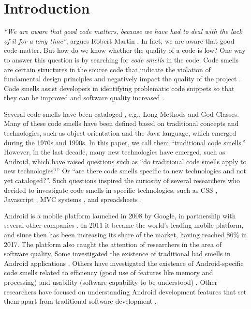 
\section{Introduction}

\emph{``We are aware that good code matters, because we have had to deal with the lack of it for a long time''}, argues Robert Martin \cite{CleanCode:08}. In fact, we are aware that good code matter. But how do we know whether the quality of a code is low? One way to answer this question is by searching for \emph{code smells} in the code. Code smells are certain structures in the source code that indicate the violation of fundamental design principles and negatively impact the quality of the project \cite{Refactoring:14}. Code smells assist developers in identifying problematic code snippets so that they can be improved and software quality increased \cite{Refactoring:99}.


Several code smells have been cataloged \cite{Refactoring:99,CleanCode:08,Refactoring:14,Webster:95}, e.g., Long Methods and God Classes. Many of these code smells have been defined based on traditional concepts and technologies, such as object orientation and the Java language, which emerged during the 1970s and 1990s. In this paper, we call them ``traditional code smells.'' However, in the last decade, many new technologies have emerged, such as Android, which have raised questions such as ``do traditional code smells apply to new technologies?'' Or ``are there code smells specific to new technologies and not yet cataloged?''. Such questions inspired the curiosity of several researchers who decided to investigate code smells in specific technologies, such as CSS \cite{CSSCodeSmell}, Javascript \cite{JavascriptSmells}, MVC systems \cite{AnicheSmellsMVC:17,MvcSmells:16}, and spreadsheets \cite{SpreadsheetsSmells:12}.

Android is a mobile platform launched in 2008 by Google, in partnership with several other companies \cite{OHAReleasesAndroidSDK:07}. In 2011 it became the world's leading mobile platform, and since then has been increasing its share of the market, having reached 86\% \cite{GlobalSmartphoneSales:09-17} in 2017.
The platform also caught the attention of researchers in the area of software quality. Some investigated the existence of traditional bad smells in Android applications \cite{Hecht:15,DomainMatters,MobileSmells:13}. Others have investigated the existence of Android-specific code smells related to efficiency (good use of features like memory and processing) and usability (software capability to be understood) \cite{RemovingEnergySmells:12, 30QualitySmells:14}. Other researchers have focused on understanding Android development features that set them apart from traditional software development \cite{Mantyla2013}.



